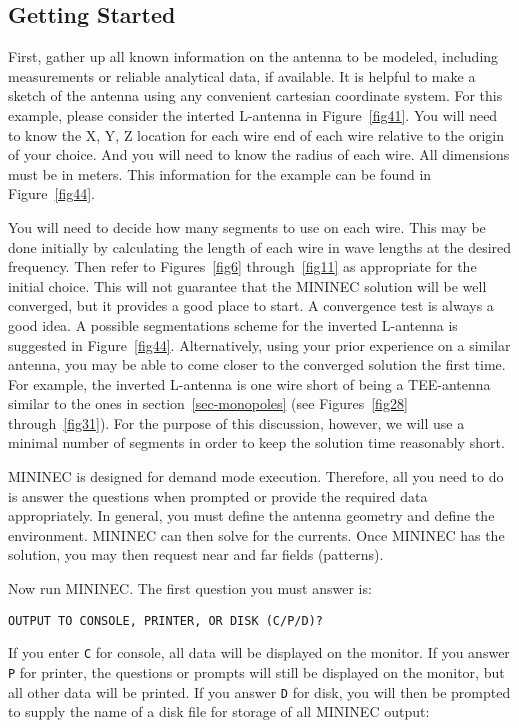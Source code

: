 \documentclass[12pt]{article}
\begin{document}
\subsection{Getting Started}
\label{sec-getting-started}
First, gather up all known information on the antenna to be modeled,
including measurements or reliable analytical data, if available. It is
helpful to make a sketch of the antenna using any convenient cartesian
coordinate system. For this example, please consider the interted
L-antenna in Figure~\ref{fig41}. You will need to know the X, Y, Z
location for each wire end of each wire relative to the origin of your
choice. And you will need to know the radius of each wire. All
dimensions must be in meters. This information for the example can be
found in Figure~\ref{fig44}.

You will need to decide how many segments to use on each wire. This may
be done initially by calculating the length of each wire in wave lengths
at the desired frequency. Then refer to Figures~\ref{fig6}
through~\ref{fig11} as appropriate for the initial choice. This will not
guarantee that the MININEC solution will be well converged, but it
provides a good place to start. A convergence test is always a good
idea. A possible segmentations scheme for the inverted L-antenna is
suggested in Figure~\ref{fig44}. Alternatively, using your prior
experience on a similar antenna, you may be able to come closer to the
converged solution the first time. For example, the inverted L-antenna
is one wire short of being a TEE-antenna similar to the ones in
section~\ref{sec-monopoles} (see Figures~\ref{fig28} through~\ref{fig31}).
For the purpose of this discussion, however, we will use a minimal
number of segments in order to keep the solution time reasonably short.

MININEC is designed for demand mode execution. Therefore, all you need
to do is answer the questions when prompted or provide the required data
appropriately. In general, you must define the antenna geometry and
define the environment. MININEC can then solve for the currents. Once
MININEC has the solution, you may then request near and far fields
(patterns).

Now run MININEC. The first question you must answer is:

\begin{Verbatim}
OUTPUT TO CONSOLE, PRINTER, OR DISK (C/P/D)?
\end{Verbatim}

If you enter \verb+C+ for console, all data will be displayed on the
monitor. If you answer \verb+P+ for printer, the questions or prompts
will still be displayed on the monitor, but all other data will be
printed. If you answer \verb+D+ for disk, you will then be prompted to
supply the name of a disk file for storage of all MININEC output:
\end{document}
